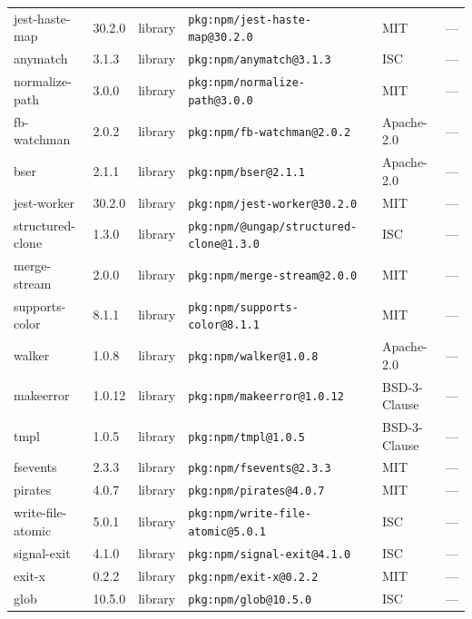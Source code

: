 \documentclass[11pt,a4paper]{article}
\begin{document}
\begin{longtable}{|p{4cm}|p{2cm}|p{1.6cm}|p{5cm}|p{1.5cm}|p{3.5cm}|}
\raggedright jest-haste-map & 30.2.0 & library & \small\texttt{pkg:npm/jest-haste-map@30.2.0} & MIT & \small — \\
\raggedright anymatch & 3.1.3 & library & \small\texttt{pkg:npm/anymatch@3.1.3} & ISC & \small — \\
\raggedright normalize-path & 3.0.0 & library & \small\texttt{pkg:npm/normalize-path@3.0.0} & MIT & \small — \\
\raggedright fb-watchman & 2.0.2 & library & \small\texttt{pkg:npm/fb-watchman@2.0.2} & Apache-2.0 & \small — \\
\raggedright bser & 2.1.1 & library & \small\texttt{pkg:npm/bser@2.1.1} & Apache-2.0 & \small — \\
\raggedright jest-worker & 30.2.0 & library & \small\texttt{pkg:npm/jest-worker@30.2.0} & MIT & \small — \\
\raggedright structured-clone & 1.3.0 & library & \small\texttt{pkg:npm/@ungap/structured-clone@1.3.0} & ISC & \small — \\
\raggedright merge-stream & 2.0.0 & library & \small\texttt{pkg:npm/merge-stream@2.0.0} & MIT & \small — \\
\raggedright supports-color & 8.1.1 & library & \small\texttt{pkg:npm/supports-color@8.1.1} & MIT & \small — \\
\raggedright walker & 1.0.8 & library & \small\texttt{pkg:npm/walker@1.0.8} & Apache-2.0 & \small — \\
\raggedright makeerror & 1.0.12 & library & \small\texttt{pkg:npm/makeerror@1.0.12} & BSD-3-Clause & \small — \\
\raggedright tmpl & 1.0.5 & library & \small\texttt{pkg:npm/tmpl@1.0.5} & BSD-3-Clause & \small — \\
\raggedright fsevents & 2.3.3 & library & \small\texttt{pkg:npm/fsevents@2.3.3} & MIT & \small — \\
\raggedright pirates & 4.0.7 & library & \small\texttt{pkg:npm/pirates@4.0.7} & MIT & \small — \\
\raggedright write-file-atomic & 5.0.1 & library & \small\texttt{pkg:npm/write-file-atomic@5.0.1} & ISC & \small — \\
\raggedright signal-exit & 4.1.0 & library & \small\texttt{pkg:npm/signal-exit@4.1.0} & ISC & \small — \\
\raggedright exit-x & 0.2.2 & library & \small\texttt{pkg:npm/exit-x@0.2.2} & MIT & \small — \\
\raggedright glob & 10.5.0 & library & \small\texttt{pkg:npm/glob@10.5.0} & ISC & \small — \\

\end{longtable}
\end{document}
